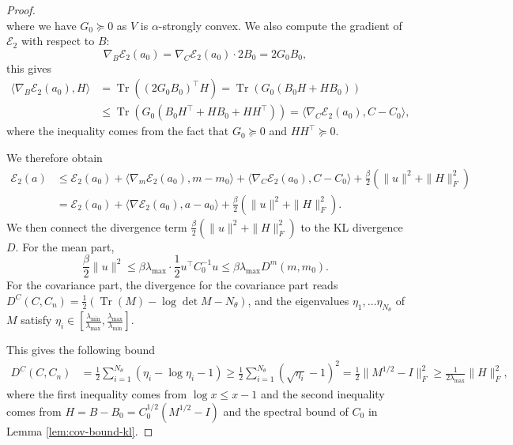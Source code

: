 \documentclass[11pt]{article}
\theoremstyle{plain}
\theoremstyle{definition}
\theoremstyle{remark}
\newcommand{\Tr}{\operatorname{Tr}}
\begin{document}
\begin{proof}
\begin{equation*}
    \end{equation*}
    where we have $G_0 \succeq 0$ as $V$ is $\alpha$-strongly convex. We also compute the gradient of $\mathcal{E}_2$ with respect to $B$:
    \begin{equation*}
        \nabla_B \mathcal{E}_2 (a_0) = \nabla_C \mathcal{E}_2 (a_0) \cdot 2B_0 = 2G_0 B_0,
    \end{equation*}
    this gives
    \begin{align*}
        \langle \nabla_B \mathcal{E}_2 (a_0), H \rangle &= \Tr ((2 G_0 B_0)^\top H) = \Tr(G_0 (B_0 H + H B_0)) \\
        &\leq \Tr(G_0 (B_0 H^\top + H B_0 + H H^\top)) = \langle \nabla_C \mathcal{E}_2 (a_0), C - C_0 \rangle,
    \end{align*}
    where the inequality comes from the fact that $G_0 \succeq 0$ and $H H^\top \succeq 0$.

    We therefore obtain
    \begin{align*}
        \mathcal{E}_2 (a) &\leq \mathcal{E}_2(a_0) +  \langle \nabla_m \mathcal{E}_2(a_0), m - m_0 \rangle + \langle \nabla_C \mathcal{E}_2 (a_0), C - C_0 \rangle + \frac{\beta }{2} (\| u \|^2 + \| H \|_F^2) \\
        &= \mathcal{E}_2(a_0) +  \langle \nabla \mathcal{E}_2(a_0), a - a_0 \rangle + \frac{\beta }{2} (\| u \|^2 + \| H \|_F^2).
    \end{align*}
    We then connect the divergence term $\frac{\beta }{2} (\| u \|^2 + \| H \|_F^2)$ to the KL divergence $D$.
    For the mean part, 
    \begin{equation*}
        \frac{\beta }{2} \|u\|^2 \leq \beta  \lambda_{\max} \cdot \frac{1}{2} u^\top C_0^{-1} u \leq \beta  \lambda_{\max} D^m (m, m_0).
    \end{equation*}
    For the covariance part, the divergence for the covariance part reads $D^C (C, C_n) = \frac{1}{2} (\Tr(M) - \log \det M - N_\theta )$, and the eigenvalues $\eta_1, \ldots \eta_{N_\theta}$ of $M$ satisfy $\eta_i \in \left[ \frac{\lambda_{\min}}{\lambda_{\max}}, \frac{\lambda_{\max}}{\lambda_{\min}} \right]$.

    This gives the following bound
    \begin{align*}
        D^C (C, C_n) &= \frac{1}{2} \sum_{i=1}^{N_\theta} (\eta_i - \log \eta_i - 1) \geq \frac{1}{2} \sum_{i=1}^{N_\theta} (\sqrt{\eta_i} - 1)^2 = \frac{1}{2} \| M^{1/2} - I \|_F^2 \geq \frac{1}{2 \lambda_{\max}} \|H\|_F^2,
    \end{align*}
    where the first inequality comes from $\log x \leq x - 1$ and the second inequality comes from $H = B - B_0 = C_0^{1/2} (M^{1/2} - I)$ and the spectral bound of $C_0$ in Lemma \ref{lem:cov-bound-kl}.
    

\end{proof}
\end{document}
